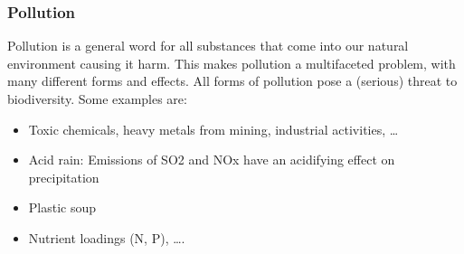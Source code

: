 \documentclass[../summary.tex]{subfiles}
\begin{document}
\subsubsection{Pollution}

Pollution is a general word for all substances that come into our natural environment causing it harm. This makes pollution a multifaceted problem, with many different forms and effects. All forms of pollution pose a (serious) threat to biodiversity. Some examples are: 
\begin{itemize}
	\item Toxic chemicals, heavy metals from mining, industrial activities, …
	\item Acid rain: Emissions of SO2 and NOx have an acidifying effect on precipitation
	\item Plastic soup
	\item Nutrient loadings (N, P), ….
\end{itemize}
\end{document}

